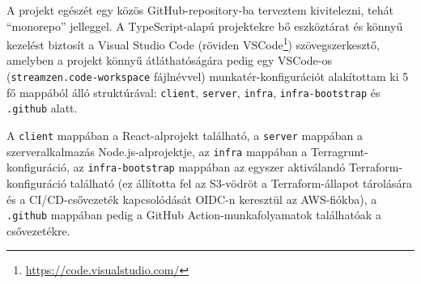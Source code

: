 A projekt egészét egy közös GitHub-repository-ba terveztem kivitelezni, tehát ``monorepo'' jelleggel. A TypeScript-alapú projektekre bő eszköztárat és könnyű kezelést biztosít a Visual Studio Code (röviden VSCode\footnote{\url{https://code.visualstudio.com/}}) szövegszerkesztő, amelyben a projekt könnyű átláthatóságára pedig egy VSCode-os (\verb|streamzen.code-workspace| fájlnévvel) munkatér-konfigurációt alakítottam ki 5 fő mappából álló struktúrával: \verb|client|, \verb|server|, \verb|infra|, \verb|infra-bootstrap| és \verb|.github| alatt.

A \verb|client| mappában a React-alprojekt található, a \verb|server| mappában a szerveralkalmazás Node.js-alprojektje, az \verb|infra| mappában a Terragrunt-konfiguráció, az \verb|infra-bootstrap| mappában az egyszer aktiválandó Terraform-konfiguráció található (ez állította fel az S3-vödröt a Terraform-állapot tárolására és a CI/CD-csővezeték kapcsolódását OIDC-n keresztül az AWS-fiókba), a \verb|.github| mappában pedig a GitHub Action-munkafolyamatok találhatóak a csővezetékre.
